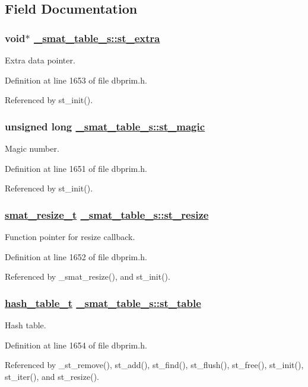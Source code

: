 \subsection{Field Documentation}
\hypertarget{struct__smat__table__s_o2}{
\subsubsection[st\_\-extra]{\setlength{\rightskip}{0pt plus 5cm}void$\ast$ \hyperlink{struct__smat__table__s_o2}{\_\-smat\_\-table\_\-s::st\_\-extra}}}
\label{struct__smat__table__s_o2}


Extra data pointer. 

Definition at line 1653 of file dbprim.h.

Referenced by st\_\-init().\hypertarget{struct__smat__table__s_o0}{
\subsubsection[st\_\-magic]{\setlength{\rightskip}{0pt plus 5cm}unsigned long \hyperlink{struct__smat__table__s_o0}{\_\-smat\_\-table\_\-s::st\_\-magic}}}
\label{struct__smat__table__s_o0}


Magic number. 

Definition at line 1651 of file dbprim.h.

Referenced by st\_\-init().\hypertarget{struct__smat__table__s_o1}{
\subsubsection[st\_\-resize]{\setlength{\rightskip}{0pt plus 5cm}\hyperlink{group__dbprim__smat_ga3}{smat\_\-resize\_\-t} \hyperlink{struct__smat__table__s_o1}{\_\-smat\_\-table\_\-s::st\_\-resize}}}
\label{struct__smat__table__s_o1}


Function pointer for resize callback. 

Definition at line 1652 of file dbprim.h.

Referenced by \_\-smat\_\-resize(), and st\_\-init().\hypertarget{struct__smat__table__s_o3}{
\subsubsection[st\_\-table]{\setlength{\rightskip}{0pt plus 5cm}\hyperlink{struct__hash__table__s}{hash\_\-table\_\-t} \hyperlink{struct__smat__table__s_o3}{\_\-smat\_\-table\_\-s::st\_\-table}}}
\label{struct__smat__table__s_o3}


Hash table. 

Definition at line 1654 of file dbprim.h.

Referenced by \_\-st\_\-remove(), st\_\-add(), st\_\-find(), st\_\-flush(), st\_\-free(), st\_\-init(), st\_\-iter(), and st\_\-resize().